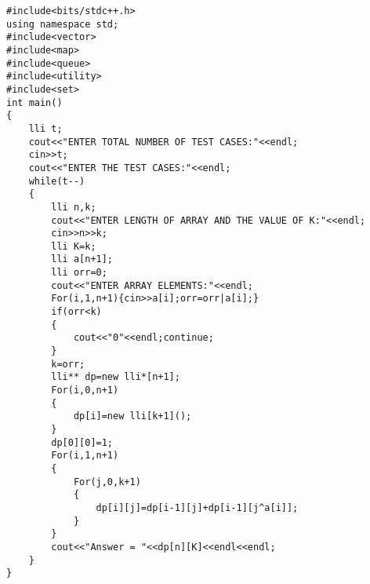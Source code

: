 \documentclass[10pt]{article}
\begin{document}
\begin{multicols*}{2}
\begin{lstlisting}
#include<bits/stdc++.h>
using namespace std;
#include<vector>
#include<map>
#include<queue>
#include<utility>
#include<set>
int main()
{
    lli t;
    cout<<"ENTER TOTAL NUMBER OF TEST CASES:"<<endl;
    cin>>t;
    cout<<"ENTER THE TEST CASES:"<<endl;
    while(t--)
    {
        lli n,k;
        cout<<"ENTER LENGTH OF ARRAY AND THE VALUE OF K:"<<endl;
        cin>>n>>k;
        lli K=k;
        lli a[n+1];
        lli orr=0;
        cout<<"ENTER ARRAY ELEMENTS:"<<endl;
        For(i,1,n+1){cin>>a[i];orr=orr|a[i];}
        if(orr<k)
        {
            cout<<"0"<<endl;continue;
        }
        k=orr;
        lli** dp=new lli*[n+1];
        For(i,0,n+1)
        {
            dp[i]=new lli[k+1]();
        }
        dp[0][0]=1;
        For(i,1,n+1)
        {
            For(j,0,k+1)
            {
                dp[i][j]=dp[i-1][j]+dp[i-1][j^a[i]];
            }
        }
        cout<<"Answer = "<<dp[n][K]<<endl<<endl;
    }
}
\end{lstlisting}
\end{multicols*}
\clearpage

	
\end{document}
